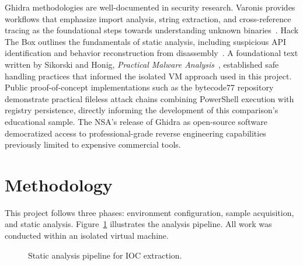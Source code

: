 \documentclass[sigconf]{acmart}
\begin{document}
\qquad Ghidra methodologies are well-documented in security research. Varonis provides workflows that emphasize import analysis, string extraction, and cross-reference tracing as the foundational steps towards understanding unknown binaries~\cite{varonis2023ghidra}. Hack The Box outlines the fundamentals of static analysis, including suspicious API identification and behavior reconstruction from disassembly~\cite{htb2024malware}. A foundational text written by Sikorski and Honig, \textit{Practical Malware Analysis}~\cite{sikorski2012practical}, established safe handling practices that informed the isolated VM approach used in this project. Public proof-of-concept implementations such as the bytecode77 repository~\cite{bytecode2024lotl} demonstrate practical fileless attack chains combining PowerShell execution with registry persistence, directly informing the development of this comparison's educational sample. The NSA's release of Ghidra as open-source software~\cite{nsacyber2024ghidra} democratized access to professional-grade reverse engineering capabilities previously limited to expensive commercial tools.


\section{Methodology}

\vspace{0.5em}
\qquad This project follows three phases: environment configuration, sample acquisition, and static analysis. Figure~\ref{fig:pipeline} illustrates the analysis pipeline. All work was conducted within an isolated virtual machine.

\begin{figure}[h]
\centering
{}
\caption{Static analysis pipeline for IOC extraction.}
\label{fig:pipeline}
\end{figure}
\end{document}
